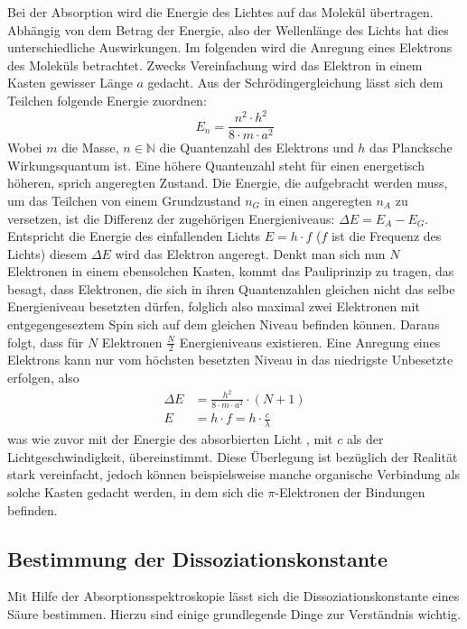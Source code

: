 \documentclass{scrartcl}
\begin{document}
Bei der Absorption wird die Energie des Lichtes auf das Molekül übertragen. Abhängig von dem Betrag der Energie, also der Wellenlänge des Lichts hat dies unterschiedliche Auswirkungen. Im folgenden wird die Anregung eines Elektrons des Moleküls betrachtet. Zwecks Vereinfachung wird das Elektron in einem Kasten gewisser Länge $a$ gedacht. Aus der Schrödingergleichung lässt sich dem Teilchen folgende Energie zuordnen: 
\begin{equation}
	E_n = \frac{n^2\cdot h^2}{8\cdot m\cdot a^2}
\end{equation}
Wobei $m$ die Masse, $n \in \mathbb{N}$ die Quantenzahl des Elektrons und $h$ das Plancksche Wirkungsquantum ist. Eine höhere Quantenzahl steht für einen energetisch höheren, sprich angeregten Zustand. Die Energie, die aufgebracht werden muss, um das Teilchen von einem Grundzustand $n_G$ in einen angeregten $n_A$ zu versetzen, ist die Differenz der zugehörigen Energieniveaus: $\Delta E=E_A - E_G$. Entspricht die Energie des einfallenden Lichts $E = h\cdot f$ ($f$ ist die Frequenz des Lichts) diesem $\Delta E$ wird das Elektron angeregt. 
Denkt man sich nun $N$ Elektronen in einem ebensolchen Kasten, kommt das Pauliprinzip zu tragen, das besagt, dass Elektronen, die sich in ihren Quantenzahlen gleichen nicht das selbe Energieniveau besetzten dürfen, folglich also maximal zwei Elektronen mit entgegengeseztem Spin sich auf dem gleichen Niveau befinden können. Daraus folgt, dass für $N$ Elektronen $\frac{N}{2}$ Energieniveaus existieren. Eine Anregung eines Elektrons kann nur vom höchsten besetzten Niveau in das niedrigste Unbesetzte erfolgen, also 
\begin{subequations}
	\begin{align}
\Delta E&=\frac{h^2}{8\cdot m\cdot a^2}\cdot(N+1)\\
E &= h\cdot f = h\cdot \frac{c}{\lambda}
\end{align}
\end{subequations}
was wie zuvor mit der Energie des absorbierten Licht , mit $c$ als der Lichtgeschwindigkeit, übereinstimmt.
Diese Überlegung ist bezüglich der Realität stark vereinfacht, jedoch können beispielsweise manche organische Verbindung als solche Kasten gedacht werden, in dem sich die $\pi$-Elektronen der Bindungen befinden. 
\subsection{Bestimmung der Dissoziationskonstante}
Mit Hilfe der Absorptionsspektroskopie lässt sich die Dissoziationskonstante eines Säure bestimmen. Hierzu sind einige grundlegende Dinge zur Verständnis wichtig.
\end{document}
